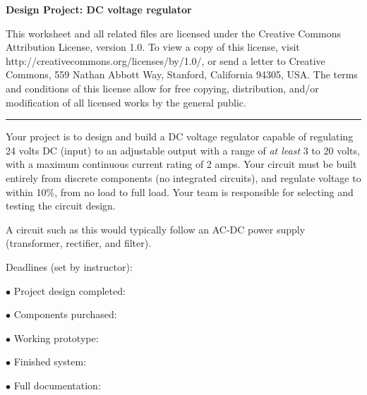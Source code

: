 
\centerline{\bf Design Project: DC voltage regulator} \bigskip 
 
This worksheet and all related files are licensed under the Creative Commons Attribution License, version 1.0.  To view a copy of this license, visit http://creativecommons.org/licenses/by/1.0/, or send a letter to Creative Commons, 559 Nathan Abbott Way, Stanford, California 94305, USA.  The terms and conditions of this license allow for free copying, distribution, and/or modification of all licensed works by the general public.

\bigskip 

\hrule

\vskip 10pt

Your project is to design and build a DC voltage regulator capable of regulating 24 volts DC (input) to an adjustable output with a range of {\it at least} 3 to 20 volts, with a maximum continuous current rating of 2 amps.  Your circuit must be built entirely from discrete components (no integrated circuits), and regulate voltage to within 10\%, from no load to full load.  Your team is responsible for selecting and testing the circuit design.

A circuit such as this would typically follow an AC-DC power supply (transformer, rectifier, and filter).

\vskip 10pt

\noindent
Deadlines (set by instructor):

\medskip
\item{$\bullet$} Project design completed: 
\item{$\bullet$} Components purchased:
\item{$\bullet$} Working prototype:
\item{$\bullet$} Finished system:
\item{$\bullet$} Full documentation:
\medskip



